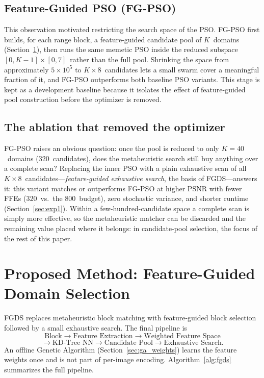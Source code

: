 \documentclass[conference, a4paper]{IEEEtran}
\begin{document}
\subsection{Feature-Guided PSO (FG-PSO)}
This observation motivated restricting the search space of the PSO. FG-PSO first builds, for each range block, a feature-guided candidate pool of \mbox{$K$}~domains (Section~\ref{sec:proposed}), then runs the same memetic PSO inside the reduced subspace \mbox{$[0,K\!-\!1]\times[0,7]$}~rather than the full pool. Shrinking the space from approximately \mbox{$5\times10^5$} to \mbox{$K\!\times\!8$}~candidates lets a small swarm cover a meaningful fraction of it, and FG-PSO outperforms both baseline PSO variants. This stage is kept as a development baseline because it isolates the effect of feature-guided pool construction before the optimizer is removed.

\subsection{The ablation that removed the optimizer}
FG-PSO raises an obvious question: once the pool is reduced to only \mbox{$K\!=\!40$}~domains (\mbox{$320$}~candidates), does the metaheuristic search still buy anything over a complete scan? Replacing the inner PSO with a plain exhaustive scan of all \mbox{$K\!\times\!8$}~candidates---\emph{feature-guided exhaustive search}, the basis of FGDS---answers it: this variant matches or outperforms FG-PSO at higher PSNR with fewer FFEs (\mbox{$320$}~vs.\ the 800~budget), zero stochastic variance, and shorter runtime (Section~\ref{sec:exp1}). Within a few-hundred-candidate space a complete scan is simply more effective, so the metaheuristic matcher can be discarded and the remaining value placed where it belongs: in candidate-pool selection, the focus of the rest of this paper.


\section{Proposed Method: Feature-Guided Domain Selection}
\label{sec:proposed}

FGDS replaces metaheuristic block matching with feature-guided block selection followed by a small exhaustive search. The final pipeline is
\[
    \text{Block}\to\text{Feature Extraction}\to\text{Weighted Feature Space}
\]
\[
    \to\text{KD-Tree NN}\to\text{Candidate Pool}\to\text{Exhaustive Search}.
\]
An offline Genetic Algorithm (Section~\ref{sec:ga_weights}) learns the feature weights once and is not part of per-image encoding. Algorithm~\ref{alg:fgds} summarizes the full pipeline.
\end{document}
